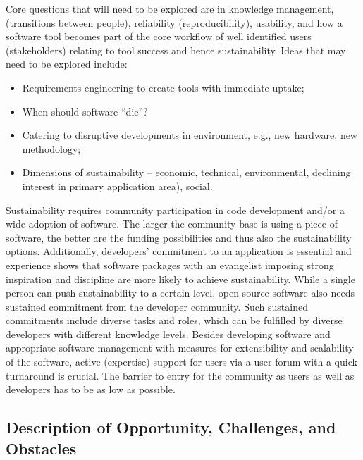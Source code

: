 Core questions that will need to be explored are in knowledge management, 
(transitions between people), reliability (reproducibility), usability, and how a software tool becomes part of the core workflow of well identified users (stakeholders)
relating to tool success and hence sustainability.  Ideas 
that may need to be explored include:
\begin{itemize}

\item Requirements engineering to create tools with immediate uptake;

\item When should software ``die''?

\item Catering to disruptive developments in environment, e.g., new hardware,
new methodology;

\item Dimensions of sustainability -- economic, technical, environmental,
declining interest in primary application area),  social.

\end{itemize}

Sustainability requires community participation in code development and/or a
wide adoption of software. The larger the community base is using a piece of
software, the better are the funding possibilities and thus also the
sustainability options. Additionally,  developers’ commitment to an application is
essential and experience shows that software packages with an evangelist
imposing strong inspiration and discipline are more likely to achieve
sustainability. While a single person can push sustainability to a certain
level, open source software also needs sustained commitment from the developer
community. Such sustained commitments include diverse tasks and roles, which can
be fulfilled by diverse developers with different knowledge levels. Besides
developing software and appropriate software management with measures for
extensibility and scalability of the software, active (expertise) support for
users via a user forum with a quick turnaround is crucial. The barrier to entry
for the community as users as well as developers has to be as low as possible.

\subsection{Description of Opportunity, Challenges, and Obstacles}

